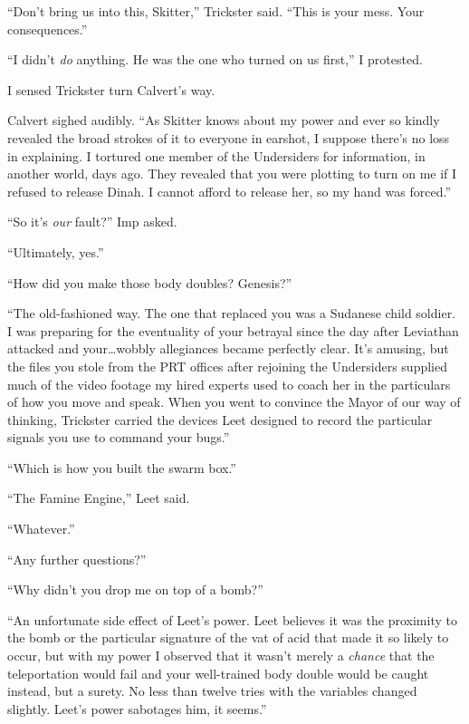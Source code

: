 ``Don't bring us into this, Skitter,'' Trickster said.  ``This is your mess.  Your consequences.''



``I didn't \emph{do} anything.  He was the one who turned on us first,'' I protested.



I sensed Trickster turn Calvert's way.



Calvert sighed audibly.  ``As Skitter knows about my power and ever so kindly revealed the broad strokes of it to everyone in earshot, I suppose there's no loss in explaining.  I tortured one member of the Undersiders for information, in another world, days ago.  They revealed that you were plotting to turn on me if I refused to release Dinah.  I cannot afford to release her, so my hand was forced.''



``So it's \emph{our} fault?'' Imp asked.



``Ultimately, yes.''



``How did you make those body doubles?  Genesis?''



``The old-fashioned way.  The one that replaced you was a Sudanese child soldier.  I was preparing for the eventuality of your betrayal since the day after Leviathan attacked and your\ldots wobbly allegiances became perfectly clear.  It's amusing, but the files you stole from the PRT offices after rejoining the Undersiders supplied much of the video footage my hired experts used to coach her in the particulars of how you move and speak.  When you went to convince the Mayor of our way of thinking, Trickster carried the devices Leet designed to record the particular signals you use to command your bugs.''



``Which is how you built the swarm box.''



``The Famine Engine,'' Leet said.



``Whatever.''



``Any further questions?''



``Why didn't you drop me on top of a bomb?''



``An unfortunate side effect of Leet's power.  Leet believes it was the proximity to the bomb or the particular signature of the vat of acid that made it so likely to occur, but with my power I observed that it wasn't merely a \emph{chance} that the teleportation would fail and your well-trained body double would be caught instead, but a surety.  No less than twelve tries with the variables changed slightly.  Leet's power sabotages him, it seems.''



